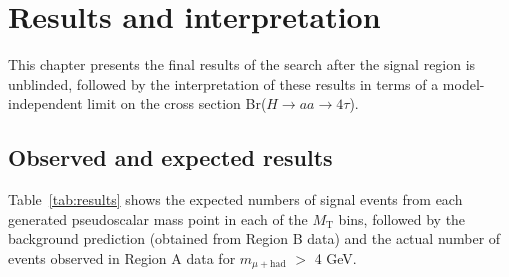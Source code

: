 \chapter{Results and interpretation\label{sec:results}}

This chapter presents the final results of the search after the signal region is unblinded, followed by the interpretation of these results in terms of a model-independent limit on the cross section Br($H\rightarrow$$aa$$\rightarrow4\tau$).

\section{Observed and expected results\label{sec:results-obsexp}}

Table~\ref{tab:results} shows the expected numbers of signal events from each generated pseudoscalar mass point in each of the $M_{\text{T}}$ bins, followed by the background prediction (obtained from Region B data) and the actual number of events observed in Region A data for $m_{\mu+\text{had}}$ $>$ 4 GeV.

